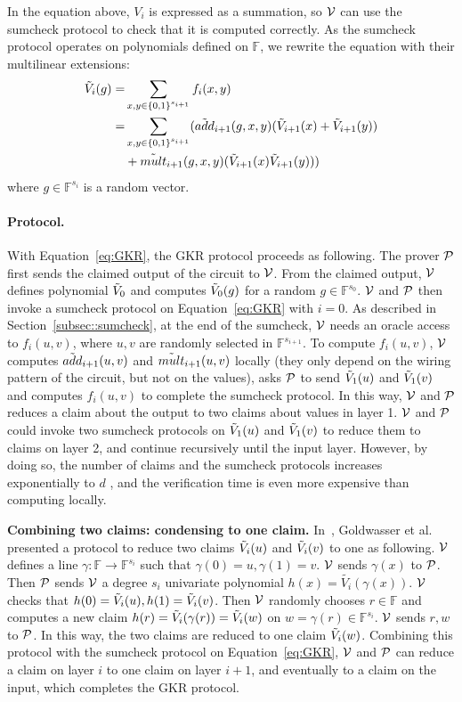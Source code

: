In the equation above, $V_i$ is expressed as a summation, so $\V$ can use the sumcheck protocol to check that it is computed correctly. As the sumcheck protocol operates on polynomials defined on $\mathbb{F}$, we rewrite the equation with their multilinear extensions:
\begin{align}\label{eq:GKR}
\tV_i(g)=&\sum_{x, y \in\binary^{s_{i+1}}}f_i(x,y)\nonumber\\
=&\sum_{x, y \in\binary^{s_{i+1}}}(\tadd_{i+1}(g,x,y)(\tV_{i+1}(x)+\tV_{i+1}(y))\nonumber\\
&+\tmult_{i+1}(g,x,y)(\tV_{i+1}(x)\tV_{i+1}(y)))
\end{align}
where $g\in\mathbb{F}^{s_i}$ is a random vector. 

\paragraph{Protocol.} With Equation~\ref{eq:GKR}, the GKR protocol proceeds as following. The prover $\P$ first sends the claimed output of the circuit to $\V$. From the claimed output, $\V$ defines polynomial $\tV_0$ and computes $\tV_0(g)$ for a random $g\in\mathbb{F}^{s_0}$. $\V$ and $\P$ then invoke a sumcheck protocol on Equation~\ref{eq:GKR} with $i=0$. As described in Section~\ref{subsec::sumcheck}, at the end of the sumcheck, $\V$ needs an oracle access to $f_i(u,v)$, where $u,v$ are randomly selected in $\mathbb{F}^{s_{i+1}}$. To compute $f_i(u,v)$, $\V$ computes $\tadd_{i+1}(u,v)$ and $\tmult_{i+1}(u,v)$ locally (they only depend on the wiring pattern of the circuit, but not on the values), asks $\P$ to send $\tV_1(u)$ and $\tV_1(v)$ and computes $f_i(u,v)$ to complete the sumcheck protocol. In this way, $\V$ and $\P$ reduces a claim about the output to two claims about values in layer 1. $\V$ and $\P$ could invoke two sumcheck protocols on $\tV_1(u)$ and $\tV_1(v)$ to reduce them to claims on layer 2, and continue recursively until the input layer. However, by doing so, the number of claims and the sumcheck protocols increases exponentially to $d$ , and the verification time is even more expensive than computing locally. 

\smallskip\noindent\textbf{Combining two claims: condensing to one claim.} In~\cite{GKR}, Goldwasser et al. presented a protocol to reduce two claims $\tV_i(u)$ and $\tV_i(v)$ to one as following. $\V$ defines a line $\gamma: \mathbb{F} \rightarrow \mathbb{F}^{s_i}$ such that $\gamma(0)=u, \gamma(1)=v$. $\V$ sends $\gamma(x)$ to $\P$. Then $\P$ sends $\V$ a degree $s_i$ univariate polynomial $h(x)=\tilde{V_i}(\gamma(x))$. $\V$ checks that $h(0)=\tV_i(u), h(1)=\tV_i(v)$. Then $\V$ randomly chooses $r\in\mathbb{F}$ and computes a new claim $h(r) = \tV_i(\gamma(r)) = \tV_i(w)$ on $w=\gamma(r) \in \mathbb{F}^{s_i}$. $\V$ sends $r, w$ to $\P$. In this way, the two claims are reduced to one claim $\tV_i(w)$. Combining this protocol with the sumcheck protocol on Equation~\ref{eq:GKR}, $\V$ and $\P$ can reduce a claim on layer $i$ to one claim on layer $i+1$, and eventually to a claim on the input, which completes the GKR protocol.


